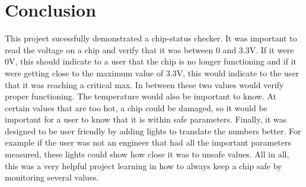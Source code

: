 \documentclass[11pt]{article}
\begin{document}
\section{Conclusion}
\quad  This project sucessfully demonstrated a chip-status checker. It was important to read the voltage on a chip and verify that it was between 0 and 3.3V. If it were 0V, this should indicate to a user that the chip is no longer functioning and if it were getting close to the maximum value of 3.3V, this would indicate to the user that it was reaching a critical max. In between these two values would verify proper functioning. The temperature would also be important to know. At certain values that are too hot, a chip could be damaged, so it would be important for a user to know that it is within safe parameters. Finally, it was designed to be user friendly by adding lights to translate the numbers better. For example if the user was not an engineer that had all the important parameters measured, these lights could show how close it was to unsafe values. All in all, this was a very helpful project learning in how to always keep a chip safe by monitoring several values. 
\end{document}
